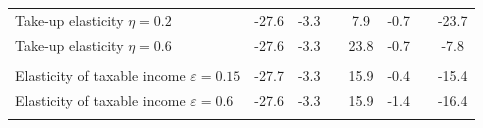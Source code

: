\begin{tabular*}{1.38\textwidth}{@{\extracolsep{\fill}}lccccccc}
Take-up elasticity $\eta = 0.2$
& -27.6 & -3.3 &
& 7.9 & -0.7 &
& -23.7  \\
Take-up elasticity $\eta = 0.6$
& -27.6  & -3.3 &
& 23.8 & -0.7 & &
-7.8  \\ 
\\
Elasticity of taxable income $\varepsilon = 0.15$ & -27.7
& -3.3 &
& 15.9 & -0.4 
& & -15.4  \\
Elasticity of taxable income $\varepsilon = 0.6$ & -27.6
& -3.3 &
& 15.9 & -1.4 & 
& -16.4  \\ \addlinespace
\bottomrule
\end{tabular*}

